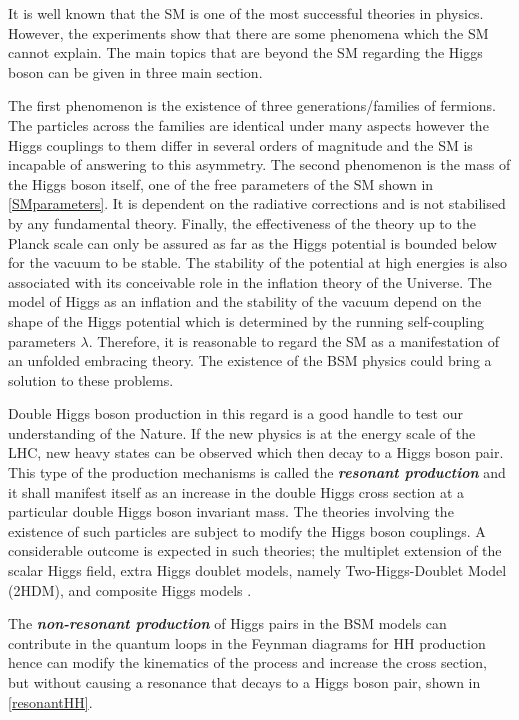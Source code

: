 It is well known that the SM is one of the most successful theories in physics. However, the experiments show that there are some phenomena which the SM cannot explain. The main topics that are beyond the SM regarding the Higgs boson can be given in three main section.

The first phenomenon is the existence of three generations/families of fermions. The particles across the families are identical under many aspects however the Higgs couplings to them differ in several orders of magnitude and the SM is incapable of answering to this asymmetry. The second phenomenon is the mass of the Higgs boson itself, one of the free parameters of the SM shown in \autoref{SMparameters}. It is dependent on the radiative corrections and is not stabilised by any fundamental theory. Finally, the effectiveness of the theory up to the Planck scale can only be assured as far as the Higgs potential is bounded below for the vacuum to be stable. The stability of the potential at high energies is also associated with its conceivable role in the inflation theory of the Universe\cite{Bezrukov2008}. The model of Higgs as an inflation and the stability of the vacuum depend on the shape of the Higgs potential which is determined by the running self-coupling parameters $\lambda$. Therefore, it is reasonable to regard the SM as a manifestation of an unfolded embracing theory. The existence of the BSM physics could bring a solution to these problems.

Double Higgs boson production in this regard is a good handle to test our understanding of the Nature. If the new physics is at the energy scale of the LHC, new heavy states can be observed which then decay to a Higgs boson pair. This type of the production mechanisms is called the \textbf{\textit{resonant production}} and it shall manifest itself as an increase in the double Higgs cross section at a particular double Higgs boson invariant mass. The theories involving the existence of such particles are subject to modify the Higgs boson couplings. A considerable outcome is expected in such theories; the multiplet extension of the scalar Higgs field\cite{Dawson2017}, extra Higgs doublet models, namely Two-Higgs-Doublet Model (2HDM)\cite{Branco2012, BluscaMato2017}, and composite Higgs models \cite{Grber2011, contino2010tasi, JHEP08-2014-095}.

The \textbf{\textit{non-resonant production}} of Higgs pairs in the BSM models can contribute in the quantum loops in the Feynman diagrams for HH production hence can modify the kinematics of the process and increase the cross section, but without causing a resonance that decays to a Higgs boson pair, shown in \autoref{resonantHH}. 

